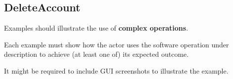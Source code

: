  
\subsection{DeleteAccount}
Examples should illustrate the use of \textbf{complex operations}.

Each example must show how the actor uses the software operation under
description to achieve (at least one of) its expected outcome.

It might be required to include GUI screenshots to illustrate the example.
